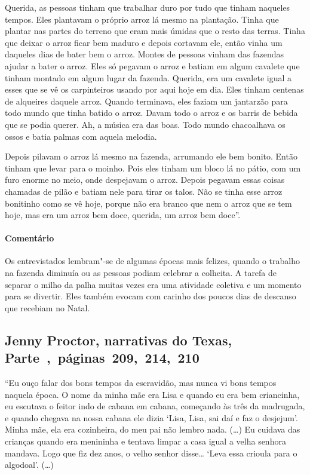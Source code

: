 Querida, as pessoas tinham que trabalhar duro por tudo que tinham
naqueles tempos. Eles plantavam o próprio arroz lá mesmo na plantação.
Tinha que plantar nas partes do terreno que eram mais úmidas que o resto
das terras. Tinha que deixar o arroz ficar bem maduro e depois cortavam
ele, então vinha um daqueles dias de bater bem o arroz. Montes de
pessoas vinham das fazendas ajudar a bater o arroz. Eles só pegavam o
arroz e batiam em algum cavalete que tinham montado em algum lugar da
fazenda. Querida, era um cavalete igual a esses que se vê os
carpinteiros usando por aqui hoje em dia. Eles tinham centenas de
alqueires daquele arroz. Quando terminava, eles faziam um jantarzão para
todo mundo que tinha batido o arroz. Davam todo o arroz e os barris de
bebida que se podia querer. Ah, a música era das boas. Todo mundo
chacoalhava os ossos e batia palmas com aquela melodia.

Depois pilavam o arroz lá mesmo na fazenda, arrumando ele bem bonito.
Então tinham que levar para o moinho. Pois eles tinham um bloco lá no
pátio, com um furo enorme no meio, onde despejavam o arroz. Depois
pegavam essas coisas chamadas de pilão e batiam nele para tirar os
talos. Não se tinha esse arroz bonitinho como se vê hoje, porque não era
branco que nem o arroz que se tem hoje, mas era um arroz bem doce,
querida, um arroz bem doce''.


\paragraph{Comentário}\quad
{\small
Os entrevistados lembram"-se de algumas épocas mais felizes, quando o
trabalho na fazenda diminuía ou as pessoas podiam celebrar a colheita. A
tarefa de separar o milho da palha muitas vezes era uma atividade
coletiva e um momento para se divertir. Eles também evocam com
carinho dos poucos dias de descanso que recebiam no Natal.
}

\subsection{Jenny Proctor, narrativas do Texas, Parte~,~páginas~209,~214,~210}
\label{ref216}

``Eu ouço falar dos bons tempos da escravidão, mas nunca vi bons tempos
naquela época. O nome da minha mãe era Lisa e quando eu era bem
criancinha, eu escutava o feitor indo de cabana em cabana, começando às
três da madrugada, e quando chegava na nossa cabana ele dizia `Lisa,
Lisa, sai daí e faz o desjejum'. Minha mãe, ela era cozinheira, do meu
pai não lembro nada. (\ldots{}) Eu cuidava das crianças quando era
menininha e tentava limpar a casa igual a velha senhora mandava. Logo
que fiz dez anos, o velho senhor disse\ldots{} `Leva essa crioula para o
algodoal'. (\ldots{})

